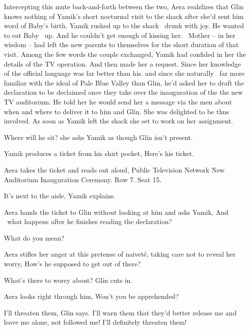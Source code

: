 \documentclass[12pt]{book}
\begin{document}
Intercepting this mute back-and-forth between the two, Aera realzlizes that Glin knows nothing of Yamik's short
nocturnal visit to the shack after she'd sent him word of Baby's birth. Yamik rushed up to the shack \ drunk with joy.
He wanted to eat Baby \ up. And he{ }couldn't get enough of kissing her. ~Mother -- in her wisdom -- had
left the new parents to themselves for the short duration of that visit. Among the few words the couple exchanged,
Yamik had confided in her the details of the TV operation. And then made her a request. Since her knowledge of the
official language was far better than his. and since she naturally \ far more familiar with the ideal of Pale Blue
Valley than Glin, he'd asked her to draft the declaration to be declaimed once they take over the inauguration of the
the new TV auditorium. He told her he would send her a message via the men about when and where to deliver it to him
and Glin. She was delighted to be thus involved. As soon as Yamik left the shack she set to work on her
assignment{. }

{\textquotedbl}Where will he sit?{\textquotedbl} she asks Yamik as though Glin isn't present.

Yamik produces a ticket from his shirt pocket, {\textquotedbl}Here's his ticket.{\textquotedbl}

Aera takes the ticket and reads out aloud, {\textquotedbl}Public Television Network New Auditorium Inauguration
Ceremony. Row 7. Seat 15.{\textquotedbl}

{\textquotedbl}It's next to the aisle,{\textquotedbl} Yamik explains.

Aera hands the ticket to Glin without looking at him and asks Yamik, {\textquotedbl}And \ what happens after he finishes
reading the declaration?{\textquotedbl}

{\textquotedbl}What do you mean?{\textquotedbl}

Aera stifles her anger at this pretense of naivet\'e, taking care not to reveal her worry, {\textquotedbl}How's he
supposed to get out of there?{\textquotedbl}

{\textquotedbl}What's there to worry about?{\textquotedbl} Glin cuts in{.}

Aera looks right through him, {\textquotedbl}Won't you be apprehended?{\textquotedbl}

{\textquotedbl}I'll threaten them,{\textquotedbl} Glin says. {\textquotedbl}I'll warn them that they'd better release me
and leave me alone, not followed me! I'll definitely threaten them!{\textquotedbl}
\end{document}
